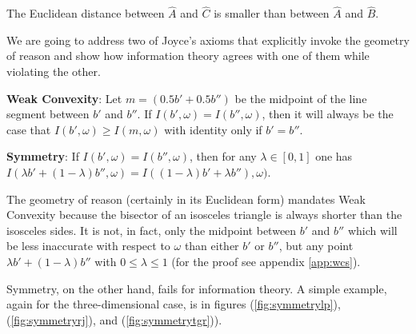 \documentclass[11pt]{article}
\begin{document}
The Euclidean distance between $\hat{A}$ and $\hat{C}$ is smaller than
between $\hat{A}$ and $\hat{B}$.

We are going to address two of Joyce's axioms that explicitly invoke
the geometry of reason and show how information theory agrees with one
of them while violating the other.

\begin{quotex}
  \textbf{Weak Convexity}: Let $m=(0.5b'+0.5b'')$ be the midpoint of the line
  segment between $b'$ and $b''$. If $I(b',\omega)=I(b'',\omega)$,
  then it will always be the case that $I(b',\omega)\geq{}I(m,\omega)$
  with identity only if $b'=b''$.
\end{quotex}

\begin{quotex}
  \textbf{Symmetry}: If $I(b',\omega)=I(b'',\omega)$, then for any
  $\lambda\in{}[0,1]$ one has\newline
  $I(\lambda{}b'+(1-\lambda)b'',\omega)=I((1-\lambda){}b'+\lambda{}b''),\omega)$.
\end{quotex}

The geometry of reason (certainly in its Euclidean form) mandates Weak
Convexity because the bisector of an isosceles triangle is always
shorter than the isosceles sides. It is not, in fact, only the
midpoint between $b'$ and $b''$ which will be less inaccurate with
respect to $\omega$ than either $b'$ or $b''$, but any point
$\lambda{}b'+(1-\lambda)b''$ with $0\leq\lambda\leq{}1$ (for the proof
see appendix \ref{app:wcs}).

Symmetry, on the other hand, fails for information theory. A simple
example, again for the three-dimensional case, is in figures
(\ref{fig:symmetrylp}), (\ref{fig:symmetryrj}), and
(\ref{fig:symmetrytgr})).
\end{document}
